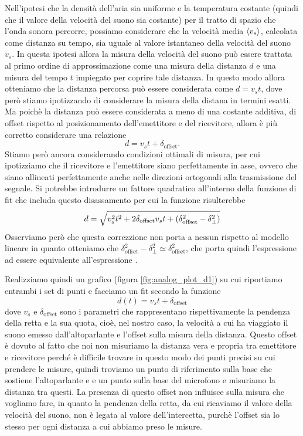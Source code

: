 \documentclass[
    rmp,
    reprint, 
    superscriptaddress, 
    altaffilletter, 
    amsmath, 
    amssymb, 
    a4paper,
    varvw]{revtex4-2}
\begin{document}
Nell'ipotesi che la densità dell'aria sia uniforme e la temperatura costante (quindi che il valore della velocità del suono sia costante) per il tratto di spazio che l'onda sonora percorre, possiamo considerare che la velocità media $\expval{v_s}$, calcolata come distanza su tempo, sia uguale al valore istantaneo della velocità del suono $v_s$. In questa ipotesi allora la misura della velocità del suono può essere trattata al primo ordine di approssimazione come una misura della distanza $d$ e una misura del tempo $t$ impiegato per coprire tale distanza. In questo modo allora otteniamo che la distanza percorsa può essere considerata come $d=v_st$, dove però stiamo ipotizzando di considerare la misura della distana in termini esatti. Ma poichè la distanza può essere considerata a meno di una costante additiva, di offset rispetto al posizionamento dell'emettitore e del ricevitore, allora è più corretto considerare una relazione \begin{equation}
    d=v_st + \delta_\text{offset}\label{eq:first_order_approx}.
\end{equation} Stiamo però ancora considerando condizioni ottimali di misura, per cui ipotizziamo che il ricevitore e l'emettitore siano perfettamente in asse, ovvero che siano allineati perfettamente anche nelle direzioni ortogonali alla trasmissione del segnale. Si potrebbe introdurre un fattore quadratico all'interno della funzione di fit che includa questo disassamento per cui la funzione risulterebbe \begin{equation}
    d=\sqrt{v_s^2t^2+2\delta_\text{offset}v_st+\qty(\delta_\text{offset}^2-\delta_\perp^2)} \label{eq:second_order_approx}
\end{equation}
Osserviamo però che questa correzzione non porta a nessun rispetto al modello lineare in quanto otteniamo che $\delta_\text{offset}^2-\delta_\perp^2 \simeq \delta_\text{offset}^2$, che porta quindi l'espressione  ad essere equivalente all'espressione .



Realizziamo quindi un grafico (figura \ref{fig:analog_plot_d1}) su cui riportiamo entrambi i set di punti e facciamo un fit secondo la funzione \begin{equation}
     d(t)=v_s t+\delta_\text{offset}
\end{equation} dove $v_s$ e $\delta_\text{offset}$ sono i parametri che rappresentano rispettivamente la pendenza della retta e la sua quota, cioè, nel nostro caso, la velocità a cui ha viaggiato il suono emesso dall'altoparlante e l'offset sulla misura della distanza. Questo offset è dovuto al fatto che noi non misuriamo la distanza vera e propria tra emettitore e ricevitore perché è difficile trovare in questo modo dei punti precisi su cui prendere le misure, quindi troviamo un punto di riferimento sulla base che sostiene l'altoparlante e e un punto sulla base del microfono e misuriamo la distanza tra questi. La presenza di questo offset non influisce sulla misura che vogliamo fare, in quanto la pendenza della retta, da cui ricaviamo il valore della velocità del suono, non è legata al valore dell'intercetta, purchè l'offset sia lo stesso per ogni distanza a cui abbiamo preso le misure.
\end{document}
